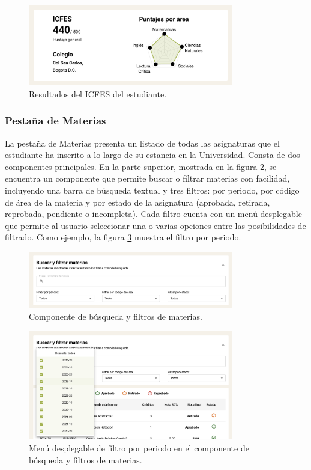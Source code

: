 \begin{figure}[H]
  \centering
  \includegraphics[width=0.8\textwidth]{img/nes/icfes.png}
  \caption{Resultados del ICFES del estudiante.}
  \label{fig:icfes}
\end{figure}

\subsubsection{Pestaña de Materias}

La pestaña de Materias presenta un listado de todas las asignaturas que el estudiante ha inscrito a lo largo de su estancia en la Universidad. Consta de dos componentes principales. En la parte superior, mostrada en la figura \ref{fig:filtros_materias}, se encuentra un componente que permite buscar o filtrar materias con facilidad, incluyendo una barra de búsqueda textual y tres filtros: por periodo, por código de área de la materia y por estado de la asignatura (aprobada, retirada, reprobada, pendiente o incompleta). Cada filtro cuenta con un menú desplegable que permite al usuario seleccionar una o varias opciones entre las posibilidades de filtrado. Como ejemplo, la figura \ref{fig:filtro_periodo_materias} muestra el filtro por periodo.

\begin{figure}[H]
  \centering
  \includegraphics[width=0.8\textwidth]{img/nes/filtros_materias.png}
  \caption{Componente de búsqueda y filtros de materias.}
  \label{fig:filtros_materias}
\end{figure}

\begin{figure}[H]
  \centering
  \includegraphics[width=0.8\textwidth]{img/nes/filtro_periodo_materias.png}
  \caption{Menú desplegable de filtro por periodo en el componente de búsqueda y filtros de materias.}
  \label{fig:filtro_periodo_materias}
\end{figure}

